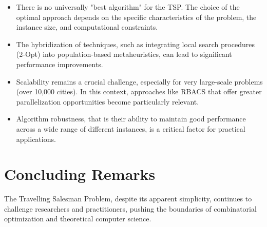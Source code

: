 \begin{itemize}
	\item There is no universally "best algorithm" for the TSP. The choice of the optimal approach depends on the specific characteristics of the problem, the instance size, and computational constraints.

	\item The hybridization of techniques, such as integrating local search procedures (2-Opt) into population-based metaheuristics, can lead to significant performance improvements.

	\item Scalability remains a crucial challenge, especially for very large-scale problems (over 10,000 cities). In this context, approaches like RBACS that offer greater parallelization opportunities become particularly relevant.

	\item Algorithm robustness, that is their ability to maintain good performance across a wide range of different instances, is a critical factor for practical applications.
\end{itemize}

\section{Concluding Remarks}
The Travelling Salesman Problem, despite its apparent simplicity, continues to challenge researchers and practitioners, pushing the boundaries of combinatorial optimization and theoretical computer science.
